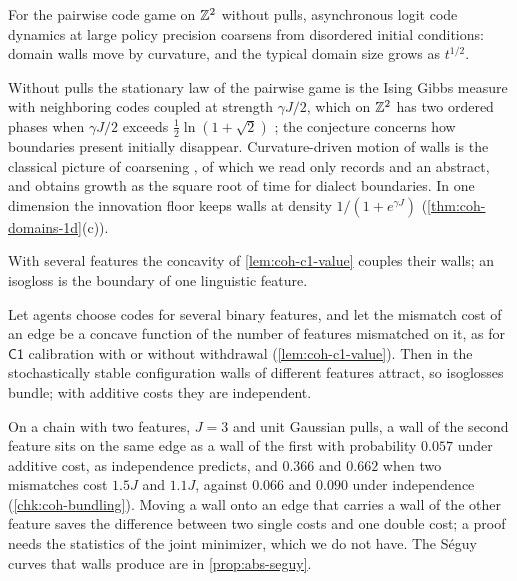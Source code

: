 \begin{conjecture}\label{conj:coh-coarsening}
For the pairwise code game on $\mathbb{Z}^2$ without pulls, asynchronous logit code dynamics at large policy precision coarsens from disordered initial conditions: domain walls move by curvature, and the typical domain size grows as $t^{1/2}$.
\end{conjecture}

Without pulls the stationary law of the pairwise game is the Ising Gibbs measure with neighboring codes coupled at strength $\gamma J/2$, which on $\mathbb{Z}^2$ has two ordered phases when $\gamma J/2$ exceeds $\frac12\ln(1+\sqrt2)$ \citep{onsager1944crystal}; the conjecture concerns how boundaries present initially disappear. Curvature-driven motion of walls is the classical picture of coarsening \citep{allen1979microscopic,bray1994theory}, of which we read only records and an abstract, and \citet{burridge2017spatial} obtains growth as the square root of time for dialect boundaries. In one dimension the innovation floor keeps walls at density $1/(1+e^{\gamma J})$ (\cref{thm:coh-domains-1d}(c)).

With several features the concavity of \cref{lem:coh-c1-value} couples their walls; an isogloss is the boundary of one linguistic feature.

\begin{conjecture}\label{conj:coh-bundling}
Let agents choose codes for several binary features, and let the mismatch cost of an edge be a concave function of the number of features mismatched on it, as for $\mathsf{C1}$ calibration with or without withdrawal (\cref{lem:coh-c1-value}). Then in the stochastically stable configuration walls of different features attract, so isoglosses bundle; with additive costs they are independent.
\end{conjecture}

On a chain with two features, $J=3$ and unit Gaussian pulls, a wall of the second feature sits on the same edge as a wall of the first with probability $0.057$ under additive cost, as independence predicts, and $0.366$ and $0.662$ when two mismatches cost $1.5J$ and $1.1J$, against $0.066$ and $0.090$ under independence (\cref{chk:coh-bundling}). Moving a wall onto an edge that carries a wall of the other feature saves the difference between two single costs and one double cost; a proof needs the statistics of the joint minimizer, which we do not have. The S\'eguy curves that walls produce are in \cref{prop:abs-seguy}.

